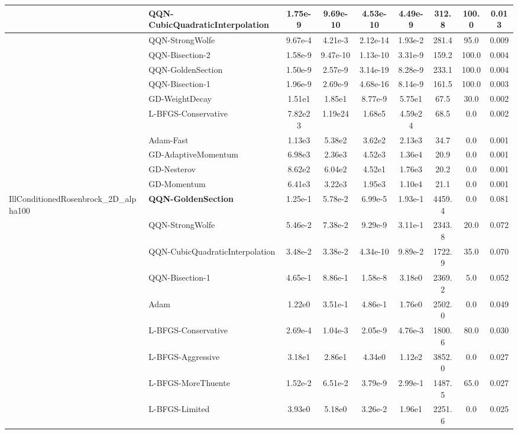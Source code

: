 \documentclass[10pt]{article}
\begin{document}
\begin{longtable}{|l|l|c|c|c|c|c|c|c|}
\hline
 & QQN-CubicQuadraticInterpolation & 1.75e-9 & 9.69e-10 & 4.53e-10 & 4.49e-9 & 312.8 & 100.0 & 0.013 \\
\hline
 & QQN-StrongWolfe & 9.67e-4 & 4.21e-3 & 2.12e-14 & 1.93e-2 & 281.4 & 95.0 & 0.009 \\
\hline
 & QQN-Bisection-2 & 1.58e-9 & 9.47e-10 & 1.13e-10 & 3.31e-9 & 159.2 & 100.0 & 0.004 \\
\hline
 & QQN-GoldenSection & 1.50e-9 & 2.57e-9 & 3.14e-19 & 8.28e-9 & 233.1 & 100.0 & 0.004 \\
\hline
 & QQN-Bisection-1 & 1.96e-9 & 2.69e-9 & 4.68e-16 & 8.14e-9 & 161.5 & 100.0 & 0.003 \\
\hline
 & GD-WeightDecay & 1.51e1 & 1.85e1 & 8.77e-9 & 5.75e1 & 67.5 & 30.0 & 0.002 \\
\hline
 & L-BFGS-Conservative & 7.82e23 & 1.19e24 & 1.68e5 & 4.59e24 & 68.5 & 0.0 & 0.002 \\
\hline
 & Adam-Fast & 1.13e3 & 5.38e2 & 3.62e2 & 2.13e3 & 34.7 & 0.0 & 0.001 \\
\hline
 & GD-AdaptiveMomentum & 6.98e3 & 2.36e3 & 4.52e3 & 1.36e4 & 20.9 & 0.0 & 0.001 \\
\hline
 & GD-Nesterov & 8.62e2 & 6.04e2 & 4.52e1 & 1.76e3 & 20.2 & 0.0 & 0.001 \\
\hline
 & GD-Momentum & 6.41e3 & 3.22e3 & 1.95e3 & 1.10e4 & 21.1 & 0.0 & 0.001 \\
IllConditionedRosenbrock\_2D\_alpha100 & \textbf{QQN-GoldenSection} & 1.25e-1 & 5.78e-2 & 6.99e-5 & 1.93e-1 & 4459.4 & 0.0 & 0.081 \\
\hline
 & QQN-StrongWolfe & 5.46e-2 & 7.38e-2 & 9.29e-9 & 3.11e-1 & 2343.8 & 20.0 & 0.072 \\
\hline
 & QQN-CubicQuadraticInterpolation & 3.48e-2 & 3.38e-2 & 4.34e-10 & 9.89e-2 & 1722.9 & 35.0 & 0.070 \\
\hline
 & QQN-Bisection-1 & 4.65e-1 & 8.86e-1 & 1.58e-8 & 3.18e0 & 2369.2 & 5.0 & 0.052 \\
\hline
 & Adam & 1.22e0 & 3.51e-1 & 4.86e-1 & 1.76e0 & 2502.0 & 0.0 & 0.049 \\
\hline
 & L-BFGS-Conservative & 2.69e-4 & 1.04e-3 & 2.05e-9 & 4.76e-3 & 1800.6 & 80.0 & 0.030 \\
\hline
 & L-BFGS-Aggressive & 3.18e1 & 2.86e1 & 4.34e0 & 1.12e2 & 3852.0 & 0.0 & 0.027 \\
\hline
 & L-BFGS-MoreThuente & 1.52e-2 & 6.51e-2 & 3.79e-9 & 2.99e-1 & 1487.5 & 65.0 & 0.027 \\
\hline
 & L-BFGS-Limited & 3.93e0 & 5.18e0 & 3.26e-2 & 1.96e1 & 2251.6 & 0.0 & 0.025 \\

\end{longtable}
\end{document}
